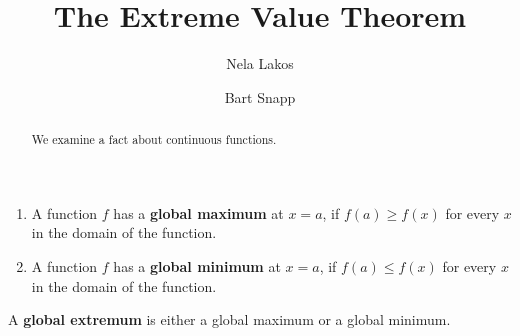 \documentclass{ximera}
\author{Nela Lakos \and Bart Snapp}
\title[Dig-In:]{The Extreme Value Theorem}
\begin{document}
\begin{abstract}
  We examine a fact about continuous functions.
\end{abstract}
\maketitle

\begin{definition}\hfil{}
\begin{enumerate}
\item A function $f$ has a \textbf{global maximum} at $x=a$, if $f(a)\ge
  f(x)$ for every $x$ in the domain of the function.
\item A function $f$ has a \textbf{global minimum} at $x=a$, if $f(a)\le
  f(x)$ for every $x$ in the domain of the function.
\end{enumerate} 
A \textbf{global extremum} is either a
global maximum or a global minimum.
\end{definition}
\end{document}
